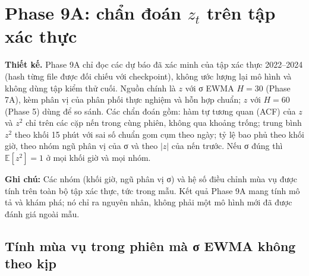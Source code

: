 \documentclass[11pt,a4paper]{article}
\newcommand{\ghichu}[1]{\par\noindent\colorbox{blue!8}{\parbox{\dimexpr\linewidth-2\fboxsep}{\small\textbf{Ghi chú:} #1}}\par}
\begin{document}
\section{\texorpdfstring{Phase 9A: chẩn đoán $z_t$ trên tập xác thực}{Phase 9A: chẩn đoán z_t trên tập xác thực}}
\label{sec:9a}

\textbf{Thiết kế.} Phase 9A chỉ đọc các dự báo đã xác minh của tập xác thực 2022--2024 (hash từng file được đối chiếu với checkpoint), không ước lượng lại mô hình và không dùng tập kiểm thử cuối. Nguồn chính là $z$ với σ EWMA $H=30$ (Phase 7A), kèm phân vị của phân phối thực nghiệm và hỗn hợp chuẩn; $z$ với $H=60$ (Phase 5) dùng để so sánh. Các chẩn đoán gồm: hàm tự tương quan (ACF) của $z$ và $z^2$ chỉ trên các cặp nến trong cùng phiên, không qua khoảng trống; trung bình $z^2$ theo khối 15 phút với sai số chuẩn gom cụm theo ngày; tỷ lệ bao phủ theo khối giờ, theo nhóm ngũ phân vị của σ và theo $|z|$ của nến trước. Nếu σ đúng thì $\mathbb E[z^2]=1$ ở mọi khối giờ và mọi nhóm.

\ghichu{Các nhóm (khối giờ, ngũ phân vị σ) và hệ số điều chỉnh mùa vụ được tính trên toàn bộ tập xác thực, tức trong mẫu. Kết quả Phase 9A mang tính mô tả và khám phá; nó chỉ ra nguyên nhân, không phải một mô hình mới đã được đánh giá ngoài mẫu.}

\gioMotPhut
{}\gioNamPhut

\subsection{Tính mùa vụ trong phiên mà σ EWMA không theo kịp}
\end{document}
